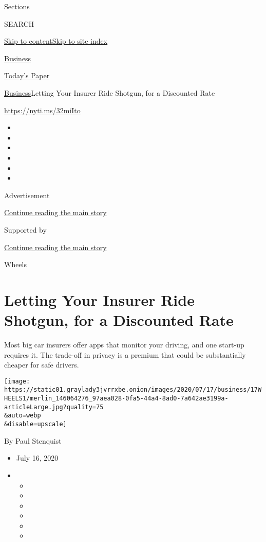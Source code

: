 Sections

SEARCH

\protect\hyperlink{site-content}{Skip to
content}\protect\hyperlink{site-index}{Skip to site index}

\href{https://www.nytimes3xbfgragh.onion/section/business}{Business}

\href{https://myaccount.nytimes3xbfgragh.onion/auth/login?response_type=cookie\&client_id=vi}{}

\href{https://www.nytimes3xbfgragh.onion/section/todayspaper}{Today's
Paper}

\href{/section/business}{Business}\textbar{}Letting Your Insurer Ride
Shotgun, for a Discounted Rate

\href{https://nyti.ms/32miIto}{https://nyti.ms/32miIto}

\begin{itemize}
\item
\item
\item
\item
\item
\item
\end{itemize}

Advertisement

\protect\hyperlink{after-top}{Continue reading the main story}

Supported by

\protect\hyperlink{after-sponsor}{Continue reading the main story}

Wheels

\hypertarget{letting-your-insurer-ride-shotgun-for-a-discounted-rate}{%
\section{Letting Your Insurer Ride Shotgun, for a Discounted
Rate}\label{letting-your-insurer-ride-shotgun-for-a-discounted-rate}}

Most big car insurers offer apps that monitor your driving, and one
start-up requires it. The trade-off in privacy is a premium that could
be substantially cheaper for safe drivers.

\texttt{[image: https://static01.graylady3jvrrxbe.onion/images/2020/07/17/business/17WHEELS1/merlin\_146064276\_97aea028-0fa5-44a4-8ad0-7a642ae3199a-articleLarge.jpg?quality=75\\\&auto=webp\\\&disable=upscale]}

By Paul Stenquist

\begin{itemize}
\item
  July 16, 2020
\item
  \begin{itemize}
  \item
  \item
  \item
  \item
  \item
  \item
  \end{itemize}
\end{itemize}

